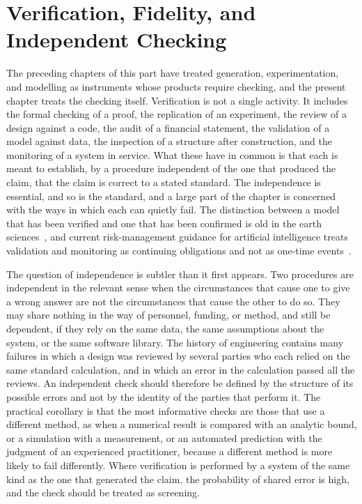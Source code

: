 \chapter{Verification, Fidelity, and Independent Checking}
\label{ch:10}

The preceding chapters of this part have treated generation, experimentation, and modelling as instruments whose products require checking, and the present chapter treats the checking itself. Verification is not a single activity. It includes the formal checking of a proof, the replication of an experiment, the review of a design against a code, the audit of a financial statement, the validation of a model against data, the inspection of a structure after construction, and the monitoring of a system in service. What these have in common is that each is meant to establish, by a procedure independent of the one that produced the claim, that the claim is correct to a stated standard. The independence is essential, and so is the standard, and a large part of the chapter is concerned with the ways in which each can quietly fail. The distinction between a model that has been verified and one that has been confirmed is old in the earth sciences~\cite{oreskes1994}, and current risk-management guidance for artificial intelligence treats validation and monitoring as continuing obligations and not as one-time events~\cite{nist2023}.

The question of independence is subtler than it first appears. Two procedures are independent in the relevant sense when the circumstances that cause one to give a wrong answer are not the circumstances that cause the other to do so. They may share nothing in the way of personnel, funding, or method, and still be dependent, if they rely on the same data, the same assumptions about the system, or the same software library. The history of engineering contains many failures in which a design was reviewed by several parties who each relied on the same standard calculation, and in which an error in the calculation passed all the reviews. An independent check should therefore be defined by the structure of its possible errors and not by the identity of the parties that perform it. The practical corollary is that the most informative checks are those that use a different method, as when a numerical result is compared with an analytic bound, or a simulation with a measurement, or an automated prediction with the judgment of an experienced practitioner, because a different method is more likely to fail differently. Where verification is performed by a system of the same kind as the one that generated the claim, the probability of shared error is high, and the check should be treated as screening.

